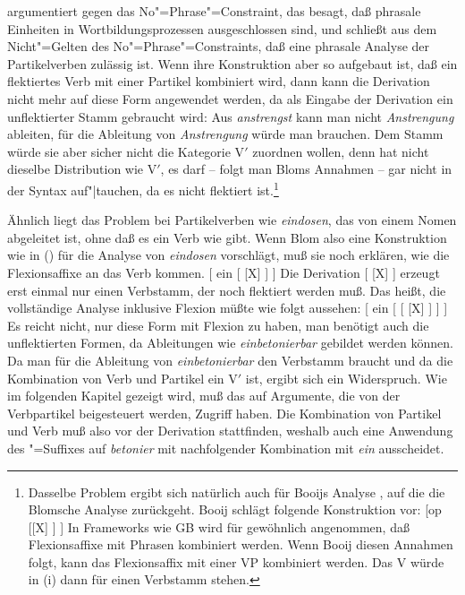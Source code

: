 \citet[]{Blom2005a} argumentiert gegen das No"=Phrase"=Constraint, das besagt,
daß phrasale Einheiten in Wortbildungsprozessen ausgeschlossen sind, und schließt aus
dem Nicht"=Gelten des No"=Phrase"=Constraints, daß eine
phrasale Analyse der Partikelverben zulässig ist. Wenn ihre Konstruktion aber so aufgebaut
ist, daß ein flektiertes Verb mit einer Partikel kombiniert wird, dann kann die Derivation
nicht mehr auf diese Form angewendet werden, da als Eingabe der Derivation ein unflektierter
Stamm gebraucht wird: Aus \emph{anstrengst} kann man nicht \emph{Anstrengung} ableiten,
für die Ableitung von \emph{Anstrengung} würde man  brauchen.
Dem Stamm  würde sie aber sicher nicht die Kategorie V$'$ zuordnen wollen,
denn  hat nicht dieselbe Distribution wie V$'$, es darf -- folgt man
Bloms Annahmen -- gar nicht in der Syntax auf"|tauchen, da es nicht flektiert ist.\footnote{
  Dasselbe Problem ergibt sich natürlich auch für Booijs Analyse \citeyearpar[]{Booij2002a},
  auf die die Blomsche Analyse zurückgeht. Booij schlägt folgende Konstruktion vor:
\ea
{}[op [[X] ] ]
\z
In Frameworks wie GB
wird für gewöhnlich angenommen, daß Flexionsaffixe mit Phrasen kombiniert werden.
Wenn Booij diesen Annahmen folgt, kann das Flexionsaffix mit einer VP kombiniert werden. Das V
würde in (i) dann für einen Verbstamm stehen.%
}

Ähnlich liegt das Problem bei Partikelverben wie \emph{eindosen}, das von einem Nomen abgeleitet
ist, ohne daß es ein Verb wie  gibt. Wenn
Blom also eine Konstruktion wie in () für die Analyse von \emph{eindosen}
vorschlägt, muß sie noch erklären, wie die Flexionsaffixe an das Verb kommen.
\ea
{}[ ein   [ [X] ] ]
\z
Die Derivation [ [X] ] erzeugt erst einmal nur einen Verbstamm, der noch
flektiert werden muß. Das heißt, die vollständige Analyse inklusive Flexion müßte
wie folgt aussehen:
\ea
{}[ ein   [ [ [X] ] ] ]
\z
Es reicht nicht, nur diese Form mit Flexion zu haben, man benötigt auch
die unflektierten Formen, da Ableitungen wie \emph{einbetonierbar} gebildet
werden können. 
Da man für die Ableitung von \emph{einbetonierbar} den Verbstamm  braucht und da
die Kombination von Verb und Partikel ein V$'$ ist, ergibt sich ein Widerspruch. Wie im folgenden
Kapitel gezeigt wird, muß das \bars auf Argumente, die von der Verbpartikel beigesteuert werden,
Zugriff haben. Die Kombination von Partikel und Verb muß also vor der Derivation stattfinden,
weshalb auch eine Anwendung des \bars"=Suffixes auf \emph{betonier} mit nachfolgender Kombination mit
\emph{ein} ausscheidet.

